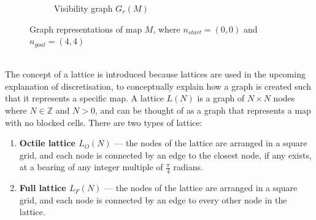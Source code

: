 \documentclass[12pt,notitlepage]{report}
\begin{document}
\begin{figure}
\begin{subfigure}{.5\textwidth}
    \caption{Visibility graph $G_{v}(M)$}
  \end{subfigure}
  \caption[Graph representations of map $M$]{Graph representations of map $M$, where $n_{start} = (0,0)$ and $n_{goal} = (4,4)$}
\end{figure}

\\
\noindent
The concept of a lattice is introduced because lattices are used in the upcoming explanation of discretisation, to conceptually explain how a graph is created such that it represents a specific map. A lattice $L(N)$ is a graph of $N \times N$ nodes where $N \in\mathbb{Z}$ and $N > 0$, and can be thought of as a graph that represents a map with no blocked cells. There are two types of lattice:\\

\begin{enumerate}
\item{\bfseries Octile lattice $L_{O}(N)$} --- the nodes of the lattice are arranged in a square grid, and each node is connected by an edge to the closest node, if any exists, at a bearing of any integer multiple of $\frac{\pi}{4}$ radians.

\item{\bfseries Full lattice $L_{F}(N)$} --- the nodes of the lattice are arranged in a square grid, and each node is connected by an edge to every other node in the lattice.
\end{enumerate}
\end{document}

